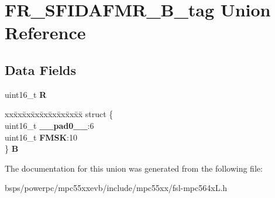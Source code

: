 \hypertarget{unionFR__SFIDAFMR__16B__tag}{}\section{F\+R\+\_\+\+S\+F\+I\+D\+A\+F\+M\+R\+\_\+B\+\_\+tag Union Reference}
\label{unionFR__SFIDAFMR__16B__tag}
\subsection*{Data Fields}
\begin{DoxyCompactItemize}
\item 
\mbox{\label{unionFR__SFIDAFMR__16B__tag_a3466a6b4eec4070c1c2ddbdc078b1b21}} 
uint16\+\_\+t {\bfseries R}
\item 
\mbox{\label{unionFR__SFIDAFMR__16B__tag_a720f42521dc62c2a348f3c02ca06e669}} 
\begin{tabbing}
xx\=xx\=xx\=xx\=xx\=xx\=xx\=xx\=xx\=\kill
struct \{\\
\>uint16\_t {\bfseries \_\_pad0\_\_}:6\\
\>uint16\_t {\bfseries FMSK}:10\\
\} {\bfseries B}\\

\end{tabbing}\end{DoxyCompactItemize}


The documentation for this union was generated from the following file\+:\begin{DoxyCompactItemize}
\item 
bsps/powerpc/mpc55xxevb/include/mpc55xx/fsl-\/mpc564x\+L.\+h\end{DoxyCompactItemize}
